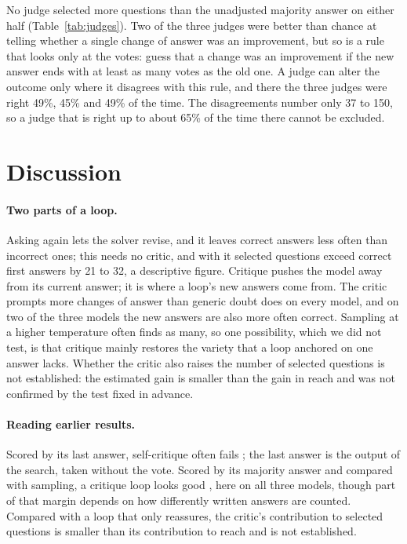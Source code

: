\documentclass[11pt]{article}
\begin{document}
No judge selected more questions than the unadjusted majority answer on either half (Table~\ref{tab:judges}).
Two of the three judges were better than chance at telling whether a single change of answer was an improvement, but so is a rule that looks only at the votes: guess that a change was an improvement if the new answer ends with at least as many votes as the old one.
A judge can alter the outcome only where it disagrees with this rule, and there the three judges were right 49\%, 45\% and 49\% of the time.
The disagreements number only 37 to 150, so a judge that is right up to about 65\% of the time there cannot be excluded.

\section{Discussion}

\paragraph{Two parts of a loop.}
Asking again lets the solver revise, and it leaves correct answers less often than incorrect ones; this needs no critic, and with it selected questions exceed correct first answers by 21 to 32, a descriptive figure.
Critique pushes the model away from its current answer; it is where a loop's new answers come from. The critic prompts more changes of answer than generic doubt does on every model, and on two of the three models the new answers are also more often correct.
Sampling at a higher temperature often finds as many, so one possibility, which we did not test, is that critique mainly restores the variety that a loop anchored on one answer lacks.
Whether the critic also raises the number of selected questions is not established: the estimated gain is smaller than the gain in reach and was not confirmed by the test fixed in advance.

\paragraph{Reading earlier results.}
Scored by its last answer, self-critique often fails \citep{huang2024cannot,stechly2024selfverification}; the last answer is the output of the search, taken without the vote.
Scored by its majority answer and compared with sampling, a critique loop looks good \citep{bilal2026refining}, here on all three models, though part of that margin depends on how differently written answers are counted.
Compared with a loop that only reassures, the critic's contribution to selected questions is smaller than its contribution to reach and is not established.
\end{document}
